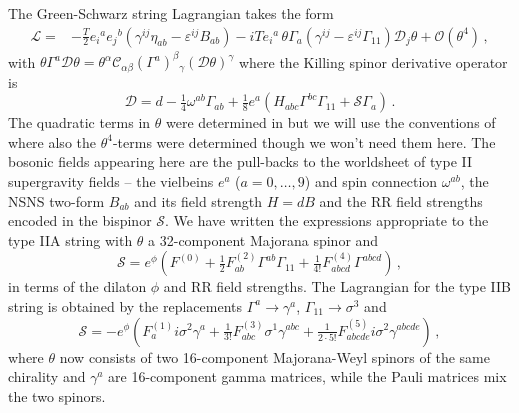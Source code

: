\documentclass[a4paper,11pt]{article}
\begin{document}
The Green-Schwarz string Lagrangian takes the form 
\begin{align}
\mathcal L=&
-\tfrac{T}{2}e_i{}^ae_j{}^b(\gamma^{ij}\eta_{ab}-\varepsilon^{ij}B_{ab})
-iTe_i{}^a\,\theta\Gamma_a(\gamma^{ij}-\varepsilon^{ij}\Gamma_{11})\mathcal D_j\theta
+\mathcal O(\theta^4)\,,
\label{eq:L}
\end{align}
with $\theta\Gamma^a\mathcal D\theta=\theta^\alpha\mathcal C_{\alpha\beta}(\Gamma^a)^\beta{}_\gamma(\mathcal D\theta)^\gamma$ where the Killing spinor derivative operator is
\begin{equation}
\mathcal D=d-\tfrac14\omega^{ab}\Gamma_{ab}+\tfrac18e^a(H_{abc}\Gamma^{bc}\Gamma_{11}+\mathcal S\Gamma_a)\,.
\label{eq:D}
\end{equation}
The quadratic terms in $\theta$ were determined in \cite{Cvetic:1999zs} but we will use the conventions of \cite{Wulff:2013kga} where also the $\theta^4$-terms were determined though we won't need them here. The bosonic fields appearing here are the pull-backs to the worldsheet of type II supergravity fields -- the vielbeins $e^a$ ($a=0,\ldots,9$) and spin connection $\omega^{ab}$, the NSNS two-form $B_{ab}$ and its field strength $H=dB$ and the RR field strengths encoded in the bispinor $\mathcal S$. We have written the expressions appropriate to the type IIA string with $\theta$ a 32-component Majorana spinor and
\begin{equation}
\mathcal S=e^\phi(F^{(0)}+\tfrac12F^{(2)}_{ab}\Gamma^{ab}\Gamma_{11}+\tfrac{1}{4!}F^{(4)}_{abcd}\Gamma^{abcd})\,,
\label{eq:SIIA}
\end{equation}
in terms of the dilaton $\phi$ and RR field strengths. The Lagrangian for the type IIB string is obtained by the replacements $\Gamma^a\rightarrow\gamma^a$, $\Gamma_{11}\rightarrow\sigma^3$ and
\begin{equation}
\mathcal S=-e^\phi(F^{(1)}_ai\sigma^2\gamma^a+\tfrac{1}{3!}F^{(3)}_{abc}\sigma^1\gamma^{abc}+\tfrac{1}{2\cdot5!}F^{(5)}_{abcde}i\sigma^2\gamma^{abcde})\,,
\label{eq:SIIB}
\end{equation}
where $\theta$ now consists of two 16-component Majorana-Weyl spinors of the same chirality and $\gamma^a$ are 16-component gamma matrices, while the Pauli matrices mix the two spinors.
\end{document}
